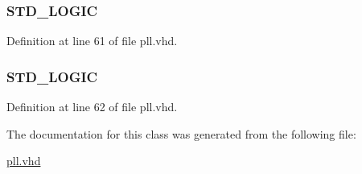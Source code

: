 \subsubsection[{sub\+\_\+wire4}]{ {\bfseries \textcolor{comment}{S\+T\+D\+\_\+\+L\+O\+G\+I\+C}\textcolor{vhdlchar}{ }} \hspace{0.3cm}{\ttfamily [Signal]}}\label{classpll_1_1_s_y_n_a1743b96eadf0499d106535e1a9241b2a}


Definition at line 61 of file pll.\+vhd.

\hypertarget{classpll_1_1_s_y_n_a428d095cdf1fa14d47c103e910135ebb}{}
\subsubsection[{sub\+\_\+wire5}]{ {\bfseries \textcolor{comment}{S\+T\+D\+\_\+\+L\+O\+G\+I\+C}\textcolor{vhdlchar}{ }} \hspace{0.3cm}{\ttfamily [Signal]}}\label{classpll_1_1_s_y_n_a428d095cdf1fa14d47c103e910135ebb}


Definition at line 62 of file pll.\+vhd.



The documentation for this class was generated from the following file\+:\begin{DoxyCompactItemize}
\item 
\hyperlink{pll_8vhd}{pll.\+vhd}\end{DoxyCompactItemize}
